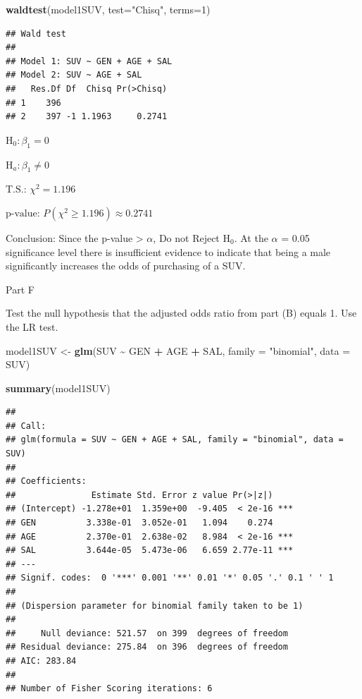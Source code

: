 \documentclass[
]{article}
\newenvironment{Shaded}{\begin{snugshade}}{\end{snugshade}}
\newcommand{\AttributeTok}[1]{\textcolor[rgb]{0.13,0.29,0.53}{#1}}
\newcommand{\DecValTok}[1]{\textcolor[rgb]{0.00,0.00,0.81}{#1}}
\newcommand{\FunctionTok}[1]{\textcolor[rgb]{0.13,0.29,0.53}{\textbf{#1}}}
\newcommand{\NormalTok}[1]{#1}
\newcommand{\OtherTok}[1]{\textcolor[rgb]{0.56,0.35,0.01}{#1}}
\newcommand{\SpecialCharTok}[1]{\textcolor[rgb]{0.81,0.36,0.00}{\textbf{#1}}}
\newcommand{\StringTok}[1]{\textcolor[rgb]{0.31,0.60,0.02}{#1}}
\begin{document}
\begin{Shaded}
\begin{Highlighting}[]
\FunctionTok{waldtest}\NormalTok{(model1SUV, }\AttributeTok{test=}\StringTok{"Chisq"}\NormalTok{, }\AttributeTok{terms=}\DecValTok{1}\NormalTok{)}
\end{Highlighting}
\end{Shaded}

\begin{verbatim}
## Wald test
## 
## Model 1: SUV ~ GEN + AGE + SAL
## Model 2: SUV ~ AGE + SAL
##   Res.Df Df  Chisq Pr(>Chisq)
## 1    396                     
## 2    397 -1 1.1963     0.2741
\end{verbatim}

\(\text{H}_{0}: \beta_{1} = 0\)

\(\text{H}_{a}: \beta_{1} \ne 0\)

\(\text{T.S.: } \chi^2 = 1.196\)

\(\text{p-value: } P(\chi^2 \ge 1.196) \approx 0.2741\)

Conclusion: Since the p-value \textgreater{} \(\alpha\), Do not Reject
\(\text{H}_{0}\). At the \(\alpha\) = 0.05 significance level there is
insufficient evidence to indicate that being a male significantly
increases the odds of purchasing of a SUV.

Part F

Test the null hypothesis that the adjusted odds ratio from part (B)
equals 1. Use the LR test.

\begin{Shaded}
\begin{Highlighting}[]
\NormalTok{model1SUV }\OtherTok{\textless{}{-}} \FunctionTok{glm}\NormalTok{(SUV }\SpecialCharTok{\textasciitilde{}}\NormalTok{ GEN }\SpecialCharTok{+}\NormalTok{ AGE }\SpecialCharTok{+}\NormalTok{ SAL, }\AttributeTok{family =} \StringTok{"binomial"}\NormalTok{, }\AttributeTok{data =}\NormalTok{ SUV)}

\FunctionTok{summary}\NormalTok{(model1SUV)}
\end{Highlighting}
\end{Shaded}

\begin{verbatim}
## 
## Call:
## glm(formula = SUV ~ GEN + AGE + SAL, family = "binomial", data = SUV)
## 
## Coefficients:
##               Estimate Std. Error z value Pr(>|z|)    
## (Intercept) -1.278e+01  1.359e+00  -9.405  < 2e-16 ***
## GEN          3.338e-01  3.052e-01   1.094    0.274    
## AGE          2.370e-01  2.638e-02   8.984  < 2e-16 ***
## SAL          3.644e-05  5.473e-06   6.659 2.77e-11 ***
## ---
## Signif. codes:  0 '***' 0.001 '**' 0.01 '*' 0.05 '.' 0.1 ' ' 1
## 
## (Dispersion parameter for binomial family taken to be 1)
## 
##     Null deviance: 521.57  on 399  degrees of freedom
## Residual deviance: 275.84  on 396  degrees of freedom
## AIC: 283.84
## 
## Number of Fisher Scoring iterations: 6
\end{verbatim}
\end{document}
